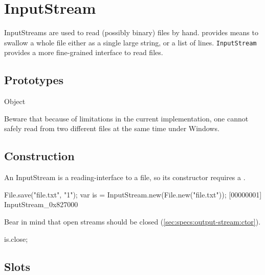 
\section{InputStream}

InputStreams are used to read (possibly binary) files by hand.
 provides means to swallow a whole file either as a
single large string, or a list of lines.  \lstinline|InputStream|
provides a more fine-grained interface to read files.

\subsection{Prototypes}
\begin{refObjects}
\item[Object]
\end{refObjects}

\begin{windows}
  Beware that because of limitations in the current implementation,
  one cannot safely read from two different files at the same time
  under Windows.
\end{windows}

\subsection{Construction}

An InputStream is a reading-interface to a file, so its constructor
requires a .

\begin{urbiscript}[firstnumber=1]
File.save("file.txt", "1\n");
var is = InputStream.new(File.new("file.txt"));
[00000001] InputStream_0x827000
\end{urbiscript}

Bear in mind that open streams should be closed
(\autoref{sec:specs:output-stream:ctor}).

\begin{urbiscript}
is.close;
\end{urbiscript}

\subsection{Slots}


